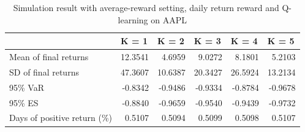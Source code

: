 \documentclass{article}
\begin{document}
\begin{table}[H]
\centering
\begin{tabular}{|l|r|r|r|r|r|} 
\hline
                             & \multicolumn{1}{l|}{K = 1} & \multicolumn{1}{l|}{K = 2} & \multicolumn{1}{l|}{K = 3} & \multicolumn{1}{l|}{K = 4} & \multicolumn{1}{l|}{K = 5}  \\ 
\hline
Mean of final returns        & 12.3541                    & 4.6959                     & 9.0272                     & 8.1801                     & 5.2103                      \\ 
\hline
SD of final returns          & 47.3607                    & 10.6387                    & 20.3427                    & 26.5924                    & 13.2134                     \\ 
\hline
95\% VaR                     & -0.8342                    & -0.9486                    & -0.9334                    & -0.8784                    & -0.9678                     \\ 
\hline
95\% ES                      & -0.8840                    & -0.9659                    & -0.9540                    & -0.9439                    & -0.9732                     \\ 
\hline
Days of positive return (\%) & 0.5107                     & 0.5094                     & 0.5099                     & 0.5098                     & 0.5107                      \\
\hline
\end{tabular}
\caption{Simulation result with average-reward setting, daily return reward and Q-learning on AAPL}
\label{table4}
\end{table}
\end{document}
